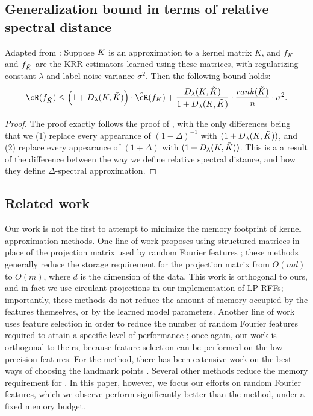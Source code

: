 \subsection{Generalization bound in terms of relative spectral distance}
\begin{proposition}{Adapted from \citep{avron17}:}
	Suppose $\tilde{K}$ is an approximation to a kernel matrix $K$, and $f_{K}$ and $f_{\tilde{K}}$ are the KRR estimators learned using these matrices, with regularizing constant $\lambda$ and label noise variance $\sigma^2$. Then the following bound holds:
	\begin{eqnarray}
	\cR(f_{\tK}) \leq \Big(1+D_{\lambda}(K,\tK)\Big)\cdot \hcR(f_K) + \frac{D_{\lambda}(K,\tK)}{1+D_{\lambda}(K,\tK)}\cdot \frac{rank(\tK)}{n}\cdot\sigma^2.
	\end{eqnarray}
\end{proposition}
\begin{proof}
	The proof exactly follows the proof of \citep{avron17}, with the only differences being that we (1) replace every appearance of $(1-\Delta)^{-1}$ with $(1+D_{\lambda}(K,\tilde{K}))$, and (2) replace every appearance of $(1+\Delta)$ with $(1+D_{\lambda}(K,\tilde{K}))$.  This is a a result of the difference between the way we define relative spectral distance, and how they define $\Delta$-spectral approximation.
\end{proof}

\subsection{Related work}
Our work is not the first to attempt to minimize the memory footprint of kernel approximation methods.  One line of work proposes using structured matrices in place of the projection matrix used by random Fourier features \citep{fastfood,yu15,sphereRKS}; these methods generally reduce the storage requirement for the projection matrix from $O(md)$ to $O(m)$, where $d$ is the dimension of the data. This work is orthogonal to ours, and in fact we use circulant projections \citep{yu15} in our implementation of LP-RFFs; importantly, these methods do not reduce the amount of memory occupied by the features themselves, or by the learned model parameters. Another line of work uses feature selection in order to reduce the number of random Fourier features required to attain a specific level of performance \citep{sparseRKS, may2016}; once again, our work is orthogonal to theirs, because feature selection can be performed on the low-precision features.  For the \Nystrom method, there has been extensive work on the best ways of choosing the landmark points \citep{kmeans08,kumar12,gittens13}.  Several other methods reduce the memory requirement for \Nystrom \cite{ensemble09,fastpred14,meka14}. In this paper, however, we focus our efforts on random Fourier features, which we observe perform significantly better than the \Nystrom method, under a fixed memory budget.

